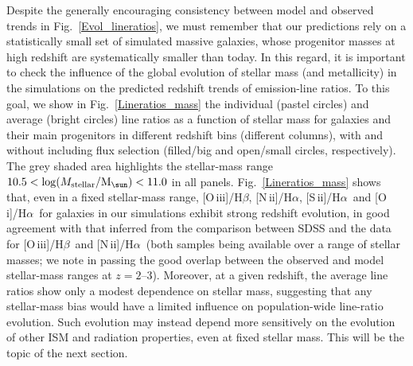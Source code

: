 \documentclass[fleqn,usenatbib]{mnras}
\newcommand{\Msun}{\hbox{M$_\sun$}}
\newcommand{\oiiihb}{\hbox{[O\,{\sc iii}]/H$\beta$}}
\newcommand{\niiha}{\hbox{[N\,{\sc ii}]/H$\alpha$}}
\newcommand{\siiha}{\hbox{[S\,{\sc ii}]/H$\alpha$}}
\newcommand{\oiha}{\hbox{[O\,{\sc i}]/H$\alpha$}}
\begin{document}
Despite the generally encouraging consistency between model and
observed trends in Fig.~\ref{Evol_lineratios}, we must remember that
our predictions rely on a  statistically small set of simulated
massive galaxies, whose progenitor masses at high redshift are
systematically smaller than today. In this regard, it is important to
check the influence of the global evolution of stellar mass (and
metallicity)  in the simulations on the predicted redshift trends of
emission-line ratios. To this goal, we show in
Fig.~\ref{Lineratios_mass} the individual (pastel circles) and
average (bright circles) line ratios as a function of stellar mass for
galaxies and their main progenitors in different redshift bins
(different columns), with and without including flux selection
(filled/big and open/small circles, respectively). The grey shaded
area highlights the stellar-mass range  $10.5<\log (M_{\rm
  stellar}/\Msun)<11.0$ in all panels. Fig.~\ref{Lineratios_mass}
shows that, even in a fixed stellar-mass range, \oiiihb, \niiha,
\siiha\ and \oiha\ for  galaxies in our simulations exhibit strong
redshift evolution, in good agreement with that inferred from the
comparison between SDSS and the  \citet{Steidel14} data for \oiiihb\
and \niiha\ (both samples being available over a range of stellar
masses; we note in passing the good overlap between the observed and
model stellar-mass ranges at $z=2$--3). Moreover, at a given redshift,
the  average line ratios show only a modest dependence on stellar
mass, suggesting  that any stellar-mass bias would have a limited
influence on population-wide line-ratio evolution. Such evolution may
instead depend more sensitively on the evolution of other ISM and
radiation properties, even at fixed stellar mass. This will  be the
topic of the next section.    
\end{document}
